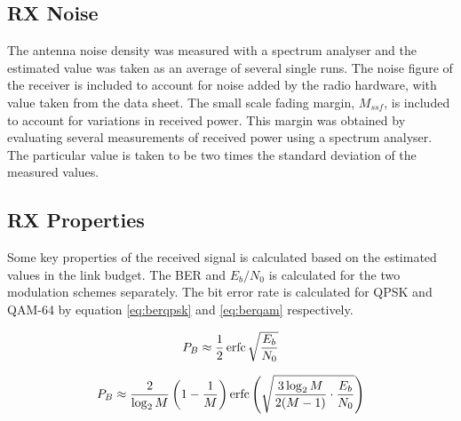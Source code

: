   
\subsection{RX Noise}
\label{sec:rxnoise}
The antenna noise density was measured with a spectrum analyser and the estimated value was taken as an average of several single runs. The noise figure of the receiver is included to account for noise added by the radio hardware, with value taken from the data sheet. The small scale fading margin, $M_{ssf}$, is included to account for variations in received power. This margin was obtained by evaluating several measurements of received power using a spectrum analyser. The particular value is taken to be two times the standard deviation of the measured values. 

\subsection{RX Properties}
\label{sec:rxproperties}
Some key properties of the received signal is calculated based on the estimated values in the link budget. The BER and $E_b/N_0$ is calculated for the two modulation schemes separately. The bit error rate is calculated for QPSK and QAM-64 by equation \ref{eq:berqpsk} and \ref{eq:berqam} respectively.

\begin{equation}
\label{eq:berqpsk}
P_B \approx \frac{1}{2}\erfc\sqrt{\frac{E_b}{N_0}}
\end{equation}

\begin{equation}
\label{eq:berqam}
P_B \approx \frac{2}{\log_2M}\left(1-\frac{1}{M}\right)\erfc\left(\sqrt{\frac{3\log_2M}{2(M-1)}\cdot \frac{E_b}{N_0}}\right)
\end{equation}


